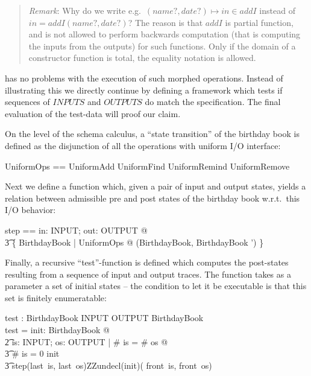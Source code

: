 \documentclass{article}
\newenvironment{remark}
{\begin{small}\begin{quote}\emph{Remark}: }{\end{quote}\end{small}}
\begin{document}
\begin{remark}
  Why do we write e.g.~$(name?,date?) \mapsto in \in addI$ instead of
  $in = addI(name?,date?)$? The reason is that $addI$ is partial
  function, and \ZAP{} is not allowed to perform backwards
  computation (that is computing the inputs from the outputs) 
  for such functions. Only if the domain of a constructor function
  is total, the equality notation is allowed.
\end{remark}

\ZAP{} has no problems with the execution of such morphed operations.
Instead of illustrating this we directly continue by defining a
framework which tests if sequences of $INPUTS$ and $OUTPUTS$ do match
the specification. The final evaluation of the test-data will proof
our claim.

On the level of the schema calculus, a ``state transition'' of the
birthday book is defined as the disjunction of all the 
operations with uniform I/O interface:

\begin{zed}
  UniformOps == UniformAdd \lor UniformFind \lor UniformRemind \lor UniformRemove
\end{zed}

Next we define a function which, given a pair of input and
output states, yields a relation between admissible pre and post states
of the birthday book w.r.t.~this I/O behavior:

\begin{axdef}
  step == \lambda in: INPUT; out: OUTPUT @ \\\t3
\{ \Delta BirthdayBook | UniformOps @ (\theta BirthdayBook, \theta BirthdayBook ') \}
\end{axdef}


Finally, a recursive ``test''-function is defined which computes the
post-states resulting from a sequence of input and output traces. The
function takes as a parameter a set of initial states -- the condition
to let it be executable is that this set is finitely enumeratable:

\begin{axdef}
  test : \power BirthdayBook \fun 
             \seq INPUT \cross \seq OUTPUT \fun  \power  BirthdayBook\\
\where
  test = \lambda  init: \power BirthdayBook @ \\\t2
          \lambda  is: \seq INPUT; os: \seq OUTPUT | \# is =  \# os @\\\t3
           \IF \# is = 0 \THEN init \\\t3
           \ELSE  step(last~is, last~os)\limg  ZZundecl(init)( front~is, front~os) \rimg 
\end{axdef}
\end{document}
